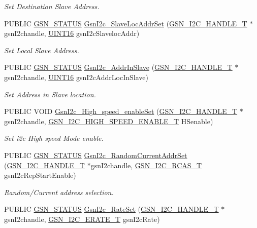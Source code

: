 \begin{DoxyCompactItemize}
\begin{DoxyCompactList}\small\item\em Set Destination Slave Address. \end{DoxyCompactList}\item 
PUBLIC \hyperlink{a00660_gada5951904ac6110b1fa95e51a9ddc217}{GSN\_\-STATUS} \hyperlink{a00649_gad36905265e175988b6f39b9724078929}{GsnI2c\_\-SlaveLocAddrSet} (\hyperlink{a00100}{GSN\_\-I2C\_\-HANDLE\_\-T} $\ast$gsnI2chandle, \hyperlink{a00660_ga09f1a1fb2293e33483cc8d44aefb1eb1}{UINT16} gsnI2cSlavelocAddr)
\begin{DoxyCompactList}\small\item\em Set Local Slave Address. \end{DoxyCompactList}\item 
PUBLIC \hyperlink{a00660_gada5951904ac6110b1fa95e51a9ddc217}{GSN\_\-STATUS} \hyperlink{a00649_ga30a24cb98453484c641cc68384a2c20a}{GsnI2c\_\-AddrInSlave} (\hyperlink{a00100}{GSN\_\-I2C\_\-HANDLE\_\-T} $\ast$gsnI2chandle, \hyperlink{a00660_ga09f1a1fb2293e33483cc8d44aefb1eb1}{UINT16} gsnI2cAddrLocInSlave)
\begin{DoxyCompactList}\small\item\em Set Address in Slave location. \end{DoxyCompactList}\item 
PUBLIC VOID \hyperlink{a00649_gaf3d84383c6018e61b76e8db674bb2fb5}{GsnI2c\_\-High\_\-speed\_\-enableSet} (\hyperlink{a00100}{GSN\_\-I2C\_\-HANDLE\_\-T} $\ast$gsnI2chandle, \hyperlink{a00649_ga78dfa46a936df5bba07b4ba66cdfca62}{GSN\_\-I2C\_\-HIGH\_\-SPEED\_\-ENABLE\_\-T} HSenable)
\begin{DoxyCompactList}\small\item\em Set i2c High speed Mode enable. \end{DoxyCompactList}\item 
PUBLIC \hyperlink{a00660_gada5951904ac6110b1fa95e51a9ddc217}{GSN\_\-STATUS} \hyperlink{a00649_ga323ceb5b782ad727f819bf1e110eb2d8}{GsnI2c\_\-RandomCurrentAddrSet} (\hyperlink{a00100}{GSN\_\-I2C\_\-HANDLE\_\-T} $\ast$gsnI2chandle, \hyperlink{a00649_ga3e0976c06462690937465a53a0c38cc4}{GSN\_\-I2C\_\-RCAS\_\-T} gsnI2cRepStartEnable)
\begin{DoxyCompactList}\small\item\em Random/Current address selection. \end{DoxyCompactList}\item 
PUBLIC \hyperlink{a00660_gada5951904ac6110b1fa95e51a9ddc217}{GSN\_\-STATUS} \hyperlink{a00649_ga087be6496fcf8dc85fab781f736c0a24}{GsnI2c\_\-RateSet} (\hyperlink{a00100}{GSN\_\-I2C\_\-HANDLE\_\-T} $\ast$gsnI2chandle, \hyperlink{a00649_gad834947ae5685696ffea0ecec904b16e}{GSN\_\-I2C\_\-ERATE\_\-T} gsnI2cRate)

\end{DoxyCompactItemize}
